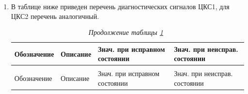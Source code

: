 \begin{enumerate}[label=\arabic{section}.\arabic{subsection}.\arabic{enumi}, labelsep=4pt, leftmargin=0pt, itemindent=57pt, itemsep=0pt, parsep=5pt]
\begin{enumerate}[label=\arabic{section}.\arabic{subsection}.\arabic{enumi}.\arabic*, labelsep=4pt, leftmargin=0em, itemindent=65pt, parsep=0pt]
\item
В таблице ниже приведен перечень диагностических сигналов ЦКС1, для ЦКС2 перечень аналогичный.
\small
\begin{longtable}{|>{\centering\arraybackslash}m{4cm}|>{\centering\arraybackslash}m{6.4cm}|>{\centering\arraybackslash}m{2.8cm}|>{\centering\arraybackslash}m{2.8cm}|}
\caption{Перечень диагностических сигналов ЦКС1\hfill\vspace{-0.5\baselineskip}}\label{desc_dzl:tbl10}\\
\hline
\rowcolor{gray!30}
Обозначение & Описание & Знач. при исправном состоянии & Знач. при неисправ. состоянии \\
\hline
\endfirsthead

\caption*{\hspace{3pt}\emph{Продолжение таблицы \ref{desc_dzl:tbl10}}\hfill\ }\vspace{-0.5\baselineskip} \\
\hline
\rowcolor{gray!30}
Обозначение & Описание & Знач. при исправном состоянии & Знач. при неисправ. состоянии \\
\hline
\endhead


\end{longtable}
\end{enumerate}
\end{enumerate}
